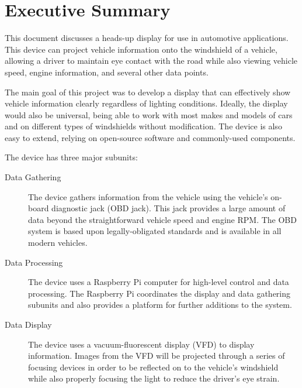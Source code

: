\chapter{Executive Summary}


This document discusses a heads-up display for use in automotive applications.
This device can project vehicle information onto the
windshield of a vehicle, allowing a driver to maintain eye contact
with the road while also viewing vehicle speed, engine information, and
several other data points.

The main goal of this project was to develop a display that can
effectively show vehicle information clearly regardless of
lighting conditions. Ideally, the display would also be universal, being able
to work with most makes and models of cars and on
different types of windshields without modification. The device is also
easy to extend, relying on open-source software and commonly-used components.

The device has three major subunits:

\begin{description}
\item[Data Gathering] The device gathers information from the
vehicle using the vehicle's on-board diagnostic jack (OBD jack). This jack
provides a large amount of data beyond the straightforward vehicle speed and
engine RPM. The OBD system is based upon legally-obligated standards and is
available in all modern vehicles.
\item[Data Processing] The device uses a Raspberry Pi computer for high-level
control and data processing. The Raspberry Pi coordinates the display and
data gathering subunits and also provides a platform for further additions to
the system. 
\item[Data Display] The device uses a vacuum-fluorescent display (VFD) to
display information. Images from the VFD will be projected through a series of
focusing devices in order to be reflected on to the vehicle's windshield while
also properly focusing the light to reduce the driver's eye strain.
\end{description}
